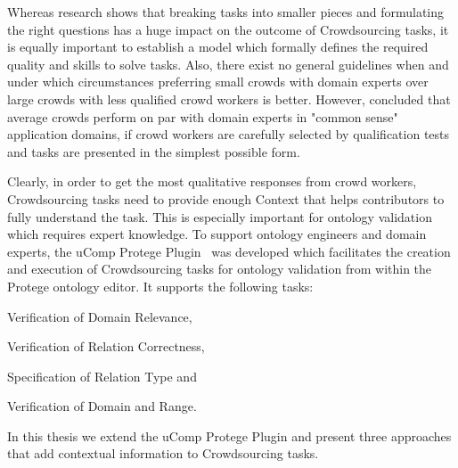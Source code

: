 Whereas research shows that breaking tasks into smaller pieces and formulating the right questions has a huge impact on the outcome of Crowdsourcing tasks, it is equally important to establish a model which formally defines the required quality and skills to solve tasks. Also, there exist no general guidelines when and under which circumstances preferring small crowds with domain experts over large crowds with less qualified crowd workers is better. However, \cite{mortensen2013} concluded that average crowds perform on par with domain experts in "common sense" application domains, if crowd workers are carefully selected by qualification tests and tasks are presented in the simplest possible form.


Clearly, in order to get the most qualitative responses from crowd workers, Crowdsourcing tasks need to provide enough Context that helps contributors to fully understand the task. This is especially important for ontology validation which requires expert knowledge. To support ontology engineers and domain experts, the uComp Protege Plugin~\cite{wohlgenannt2016} was developed which facilitates the creation and execution of Crowdsourcing tasks for ontology validation from within the Protege ontology editor. It supports the following tasks:
\begin{inparaenum}[1)]
		\item Verification of Domain Relevance,
		\item Verification of Relation Correctness,
		\item Specification of Relation Type and 
		\item Verification of Domain and Range.
\end{inparaenum}

In this thesis we extend the uComp Protege Plugin and present three approaches that add contextual information to Crowdsourcing tasks.
